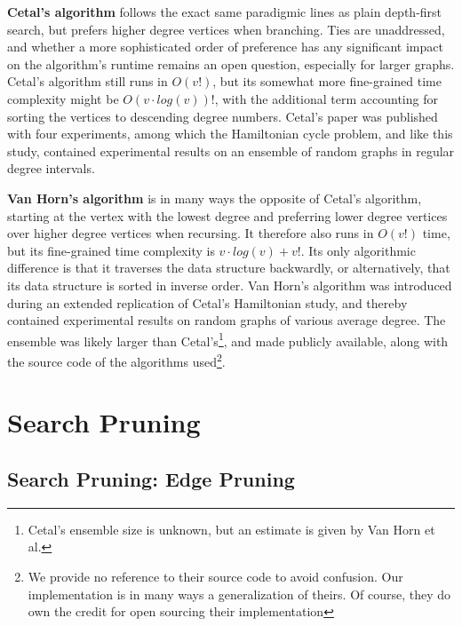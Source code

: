 \documentclass[10pt,conference,compsocconf]{IEEEtran}
\begin{document}
\textbf{Cetal's algorithm} follows the exact same paradigmic lines as plain depth-first search, but prefers higher degree vertices when branching. Ties are unaddressed, and whether a more sophisticated order of preference has any significant impact on the algorithm's runtime remains an open question, especially for larger graphs. Cetal's algorithm still runs in $O(v!)$, but its somewhat more fine-grained time complexity might be $O(v \cdot log(v))!$, with the additional term accounting for sorting the vertices to descending degree numbers. Cetal's paper was published with four experiments, among which the Hamiltonian cycle problem, and like this study, contained experimental results on an ensemble of random graphs in regular degree intervals.

\textbf{Van Horn's algorithm} is in many ways the opposite of Cetal's algorithm, starting at the vertex with the lowest degree and preferring lower degree vertices over higher degree vertices when recursing. It therefore also runs in $O(v!)$ time, but its  fine-grained time complexity is $v \cdot log(v)+v!$. Its only algorithmic difference is that it traverses the data structure backwardly, or alternatively, that its data structure is sorted in inverse order. Van Horn's algorithm was introduced during an extended replication of Cetal's Hamiltonian study, and thereby contained experimental results on random graphs of various average degree. The ensemble was likely larger than Cetal's\footnote{Cetal's ensemble size is unknown, but an estimate is given by Van Horn et al.}, and made publicly available, along with the source code of the algorithms used\footnote{We provide no reference to their source code to avoid confusion. Our implementation is in many ways a generalization of theirs. Of course, they do own the credit for open sourcing their implementation}.





\section{Search Pruning}

\subsection{Search Pruning: Edge Pruning}
\end{document}
